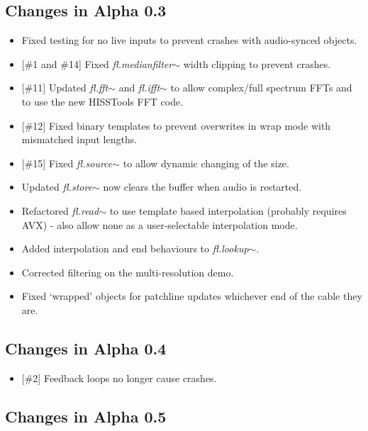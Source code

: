 \documentclass{article}
\newcommand{\flobject}[1]{\textit{fl.#1$\sim$}}
\begin{document}
\subsection{Changes in Alpha 0.3}
\vspace{0.1in}

\begin{itemize}
\item Fixed testing for no live inputs to prevent crashes with audio-synced objects.
\item {[\#1 and \#14]} Fixed \flobject{medianfilter} width clipping to prevent crashes.
\item {[\#11]} Updated \flobject{fft} and \flobject{ifft} to allow complex/full spectrum FFTs and to use the new HISSTools FFT code.
\item {[\#12]} Fixed binary templates to prevent overwrites in wrap mode with mismatched input lengths.
\item {[\#15]} Fixed \flobject{source} to allow dynamic changing of the size.
\item Updated \flobject{store} now clears the buffer when audio is restarted.
\item Refactored \flobject{read} to use template based interpolation (probably requires AVX) - also allow none as a user-selectable interpolation mode.
\item Added interpolation and end behaviours to \flobject{lookup}.
\item Corrected filtering on the multi-resolution demo.
\item Fixed `wrapped' objects for patchline updates whichever end of the cable they are.
\end{itemize}

\subsection{Changes in Alpha 0.4}
\vspace{0.1in}

\begin{itemize}
\item {[\#2]} Feedback loops no longer cause crashes.
\end{itemize}

\subsection{Changes in Alpha 0.5}
\vspace{0.1in}
    
\end{document}
